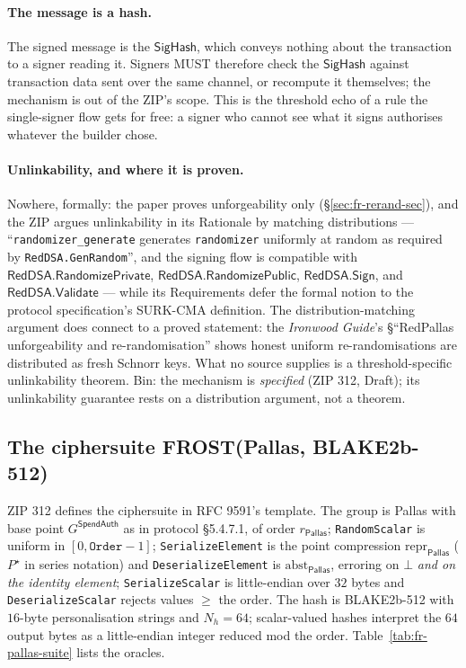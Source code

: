 \documentclass[11pt,a4paper]{article}
\theoremstyle{definition}
\newcommand{\Pallas}{\ensuremath{\mathsf{Pallas}}}
\begin{document}
\paragraph{The message is a hash.} The signed message is the
$\mathsf{SigHash}$, which conveys nothing about the transaction to a
signer reading it. Signers MUST therefore check the
$\mathsf{SigHash}$ against transaction data sent over the same channel,
or recompute it themselves; the mechanism is out of the ZIP's scope.
This is the threshold echo of a rule the single-signer flow gets for
free: a signer who cannot see what it signs authorises whatever the
builder chose.

\paragraph{Unlinkability, and where it is proven.} Nowhere, formally:
the paper proves unforgeability only (\S\ref{sec:fr-rerand-sec}), and
the ZIP argues unlinkability in its Rationale by matching distributions
--- ``\texttt{randomizer\_generate} generates \texttt{randomizer}
uniformly at random as required by \texttt{RedDSA.GenRandom}'', and the
signing flow is compatible with $\mathsf{RedDSA.RandomizePrivate}$,
$\mathsf{RedDSA.RandomizePublic}$, $\mathsf{RedDSA.Sign}$, and
$\mathsf{RedDSA.Validate}$ --- while its Requirements defer the
formal notion to the protocol specification's SURK-CMA definition. The
distribution-matching argument does connect to a proved statement: the
\emph{Ironwood Guide}'s \S``RedPallas unforgeability and
re-randomisation'' shows honest uniform re-randomisations are
distributed as fresh Schnorr keys. What no source supplies is a
threshold-specific unlinkability theorem. Bin: the mechanism is
\emph{specified} (ZIP 312, Draft); its unlinkability guarantee rests on
a distribution argument, not a theorem.

\subsection{The ciphersuite FROST(Pallas, BLAKE2b-512)}
\label{sec:fr-rerand-suite}

ZIP 312 defines the ciphersuite in RFC 9591's template. The group is
Pallas with base point $G^{\mathsf{SpendAuth}}$ as in protocol \S5.4.7.1,
of order $r_{\Pallas}$; \texttt{RandomScalar} is uniform in
$[0, \mathtt{Order} - 1]$; \texttt{SerializeElement} is the point
compression $\mathrm{repr}_{\Pallas}$ ($P^\star$ in series notation) and
\texttt{DeserializeElement} is $\mathrm{abst}_{\Pallas}$, erroring on
$\bot$ \emph{and on the identity element}; \texttt{SerializeScalar} is
little-endian over $32$ bytes and \texttt{DeserializeScalar} rejects
values $\ge$ the order. The hash is BLAKE2b-512 with $16$-byte
personalisation strings and $N_h = 64$; scalar-valued hashes interpret
the $64$ output bytes as a little-endian integer reduced mod the order.
Table~\ref{tab:fr-pallas-suite} lists the oracles.
\end{document}
